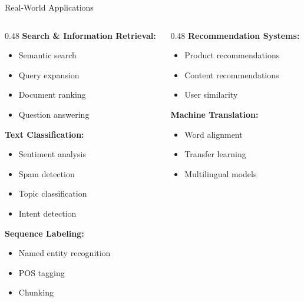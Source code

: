 \documentclass[aspectratio=169]{beamer}
\begin{document}
\begin{frame}[shrink=10]{Real-World Applications 🌟}
\begin{columns}[T]
\begin{column}{0.48\textwidth}
\textbf{Search \& Information Retrieval:}
\begin{itemize}\setlength{\itemsep}{0pt}
    \item Semantic search
    \item Query expansion
    \item Document ranking
    \item Question answering
\end{itemize}

\vspace{0.5em}
\textbf{Text Classification:}
\begin{itemize}\setlength{\itemsep}{0pt}
    \item Sentiment analysis
    \item Spam detection
    \item Topic classification
    \item Intent detection
\end{itemize}

\vspace{0.5em}
\textbf{Sequence Labeling:}
\begin{itemize}\setlength{\itemsep}{0pt}
    \item Named entity recognition
    \item POS tagging
    \item Chunking
\end{itemize}
\end{column}

\begin{column}{0.48\textwidth}
\textbf{Recommendation Systems:}
\begin{itemize}\setlength{\itemsep}{0pt}
    \item Product recommendations
    \item Content recommendations
    \item User similarity
\end{itemize}

\vspace{0.5em}
\textbf{Machine Translation:}
\begin{itemize}\setlength{\itemsep}{0pt}
    \item Word alignment
    \item Transfer learning
    \item Multilingual models
\end{itemize}


\end{column}
\end{columns}
\end{frame}
\end{document}
